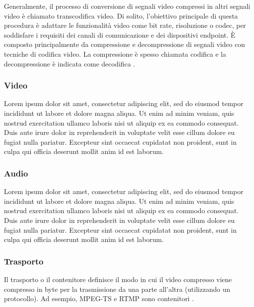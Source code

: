 Generalmente, il processo di conversione di segnali video compressi in altri segnali video è chiamato transcodifica video. Di solito, l'obiettivo principale di questa procedura è adattare le funzionalità video come bit rate, risoluzione o codec, per soddisfare i requisiti dei canali di comunicazione e dei dispositivi endpoint. È composto principalmente da compressione e decompressione di segnali video con tecniche di codifica video. La compressione è spesso chiamata codifica e la decompressione è indicata come decodifica \parencite{CombinedICTTechnologies}.

\subsubsection{Video}
Lorem ipsum dolor sit amet, consectetur adipiscing elit, sed do eiusmod tempor incididunt ut labore et dolore magna aliqua. Ut enim ad minim veniam, quis nostrud exercitation ullamco laboris nisi ut aliquip ex ea commodo consequat. Duis aute irure dolor in reprehenderit in voluptate velit esse cillum dolore eu fugiat nulla pariatur. Excepteur sint occaecat cupidatat non proident, sunt in culpa qui officia deserunt mollit anim id est laborum.

\subsubsection{Audio}
Lorem ipsum dolor sit amet, consectetur adipiscing elit, sed do eiusmod tempor incididunt ut labore et dolore magna aliqua. Ut enim ad minim veniam, quis nostrud exercitation ullamco laboris nisi ut aliquip ex ea commodo consequat. Duis aute irure dolor in reprehenderit in voluptate velit esse cillum dolore eu fugiat nulla pariatur. Excepteur sint occaecat cupidatat non proident, sunt in culpa qui officia deserunt mollit anim id est laborum.

\subsubsection{Trasporto}
Il trasporto o il contenitore definisce il modo in cui il video compresso viene compresso in byte per la trasmissione da una parte all'altra (utilizzando un protocollo). Ad esempio, MPEG-TS e RTMP sono contenitori \parencite{CombinedICTTechnologies}.

